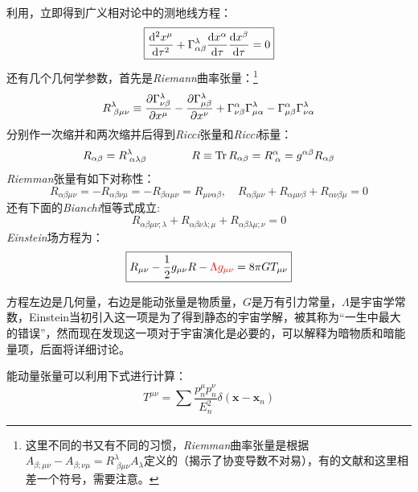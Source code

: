 \documentclass{ctexart}
\newcommand{\dotemph}[1]{\CJKunderdot{#1}}
\begin{document}
	利用\dotemph{等效原理}，立即得到广义相对论中的测地线方程：
	\begin{equation}
		\boxed{
		\dv[2]{x^\mu}{\tau}+\Gamma^\lambda_{\alpha\beta}\dv{x^\alpha}{\tau}	\dv{x^\beta}{\tau}	=0
	}
	\end{equation}
	还有几个几何学参数，首先是\textit{Riemann}曲率张量：\footnote{这里不同的书又有不同的习惯，\textit{Riemman}曲率张量是根据$A_{\beta;\mu\nu}-A_{\beta;\nu\mu}=R^\lambda_{\;\beta\mu\nu}A_\lambda$定义的（揭示了协变导数不对易），有的文献和这里相差一个符号，需要注意。}
	\begin{equation}
		R^{\lambda}_{\;\beta\mu\nu}\equiv\pdv{\Gamma^\lambda_{\nu\beta}}{x^\mu}-\pdv{\Gamma^{\lambda}_{\mu\beta}}{x^\nu}+\Gamma^\alpha_{\nu\beta}\Gamma^\lambda_{\mu\alpha}-\Gamma^{\alpha}_{\mu\beta}\Gamma^\lambda_{\nu\alpha}
	\end{equation}
	分别作一次缩并和两次缩并后得到\textit{Ricci}张量和\textit{Ricci}标量：
	\begin{equation}
		R_{\alpha\beta}=R^\lambda_{\;\alpha\lambda\beta}\qquad \qquad R\equiv \Tr R_{\alpha\beta}=R^\alpha_{\;\alpha}=g^{\alpha\beta}R_{\alpha\beta}
	\end{equation}
	\textit{Riemman}张量有如下对称性：
	\begin{equation}
		R_{\alpha\beta\mu\nu}=-R_{\alpha\beta\nu\mu}=-R_{\beta\alpha\mu\nu}=R_{\mu\nu\alpha\beta},\quad	R_{\alpha\beta\mu\nu}+R_{\alpha\mu\nu\beta}+R_{\alpha\nu\beta\mu}=0
	\end{equation}
	还有下面的{\itshape Bianchi}恒等式成立:
	\begin{equation}
		R_{\alpha\beta\mu\nu;\lambda}+R_{\alpha\beta\nu\lambda;\mu}+R_{\alpha\beta\lambda\mu;\nu}=0
	\end{equation}
	\textit{Einstein}场方程为：
	\begin{equation}
		\label{GREQ}
		\boxed{
		R_{\mu\nu}-\frac{1}{2}g_{\mu\nu}R-{\color{red} \Lambda g_{\mu\nu}}=8\pi G T_{\mu\nu}
	}
	\end{equation}
	
	方程左边是几何量，右边是能动张量是物质量，$G$是万有引力常量，$\Lambda$是宇宙学常数，Einstein当初引入这一项是为了得到静态的宇宙学解，被其称为“一生中最大的错误”，然而现在发现这一项对于宇宙演化是必要的，可以解释为暗物质和暗能量项，后面将详细讨论。
	
	能动量张量可以利用下式进行计算：
	\begin{equation}
		T^{\mu\nu}=\sum\frac{p_n^\mu p_n^\nu}{E_n^2}\delta\left(\mathbf{x}-\mathbf{x}_n\right)
	\end{equation}
\end{document}

